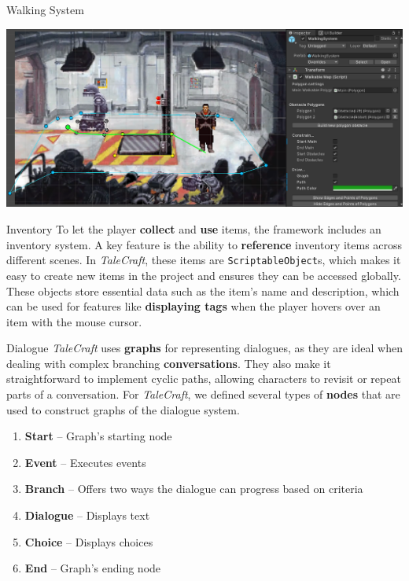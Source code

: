 \documentclass[portrait,a0paper,fontscale=0.35]{baposter}
\begin{document}
\begin{poster}
\begin{posterbox}[column=0, span=1, name=ws, below=cs]{Walking System}
\begin{center}
\includegraphics[width=0.8\linewidth]{img/walkable_map5.png}
\end{center}
\end{posterbox}

%
%
%

\begin{posterbox}[column=1, span=1, name=is]{Inventory}
To let the player \textbf{collect} and \textbf{use} items, the framework includes an inventory system. A key feature is the ability to \textbf{reference} inventory items across different scenes. In \textit{TaleCraft}, these items are \verb|ScriptableObject|s, which makes it easy to create new items in the project and ensures they can be accessed globally. These objects store essential data such as the item's name and description, which can be used for features like \textbf{displaying tags }when the player hovers over an item with the mouse cursor.
\end{posterbox}

\begin{posterbox}[column=1, span=1, name=ds, below=is, %
]{Dialogue}
\textit{TaleCraft} uses \textbf{graphs} for representing dialogues, as they are ideal when dealing with complex branching \textbf{conversations}. They also make it straightforward to implement cyclic paths, allowing characters to revisit or repeat parts of a conversation. For \textit{TaleCraft}, we defined several types of \textbf{nodes} that are used to construct graphs of the dialogue system.

\begin{multicols}{2}
\begin{enumerate}
\setlength
\itemsep{0.0em}
    \item \textbf{Start} -- Graph's starting node
    \item \textbf{Event} -- Executes events
    \item \textbf{Branch} -- Offers two ways the dialogue can progress based on criteria
    \item \textbf{Dialogue} -- Displays text
    \item \textbf{Choice} -- Displays choices
    \item \textbf{End} -- Graph's ending node
\end{enumerate}
\end{multicols}


\end{posterbox}
\end{poster}
\end{document}
